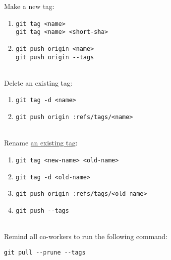 \documentclass{report}
\begin{document}
Make a new tag:
\begin{enumerate}[noitemsep]
    \item
    \begin{verbatim}
git tag <name>
git tag <name> <short-sha>
    \end{verbatim}
    \item
    \begin{verbatim}
git push origin <name>
git push origin --tags
    \end{verbatim}
\end{enumerate}
\\
Delete an existing tag:
\begin{enumerate}[noitemsep]
    \item 
    \begin{verbatim}
git tag -d <name>
    \end{verbatim}
    \item
    \begin{verbatim}
git push origin :refs/tags/<name>
    \end{verbatim}
\end{enumerate}
\\
Rename \href{https://stackoverflow.com/questions/1028649/how-do-you-rename-a-git-tag}{an existing tag}:
\begin{enumerate}[noitemsep]
    \item 
    \begin{verbatim}
git tag <new-name> <old-name>
    \end{verbatim}
    \item
    \begin{verbatim}
git tag -d <old-name>
    \end{verbatim}
    \item
    \begin{verbatim}
git push origin :refs/tags/<old-name>
    \end{verbatim}
    \item
    \begin{verbatim}
git push --tags
    \end{verbatim}
\end{enumerate}
\\
Remind all co-workers to run the following command:
\begin{verbatim}
git pull --prune --tags
\end{verbatim}
\end{document}

